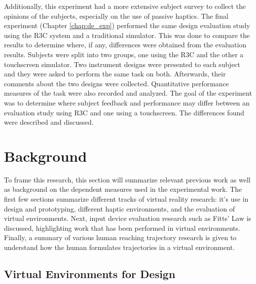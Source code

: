 Additionally, this experiment had a more extensive subject survey to collect the opinions of the subjects, especially on the use of passive haptics.
The final experiment (Chapter \ref{chap:de_exp}) performed the same design evaluation study using the R3C system and a traditional simulator.
This was done to compare the results to determine where, if any, differences were obtained from the evaluation results.
Subjects were split into two groups, one using the R3C and the other a touchscreen simulator.
Two instrument designs were presented to each subject and they were asked to perform the same task on both.
Afterwards, their comments about the two designs were collected.
Quantitative performance measures of the task were also recorded and analyzed.
The goal of the experiment was to determine where subject feedback and performance may differ between an evaluation study using R3C and one using a touchscreen.
The differences found were described and discussed.

\section{Background}

To frame this research, this section will summarize relevant previous work as well as background on the dependent measures used in the experimental work.
The first few sections summarize different tracks of virtual reality research: it's use in design and prototyping, different haptic environments, and the evaluation of virtual environments.
Next, input device evaluation research such as Fitts' Law is discussed, highlighting work that has been performed in virtual environments.
Finally, a summary of various human reaching trajectory research is given to understand how the human formulates trajectories in a virtual environment.

\subsection{Virtual Environments for Design}

